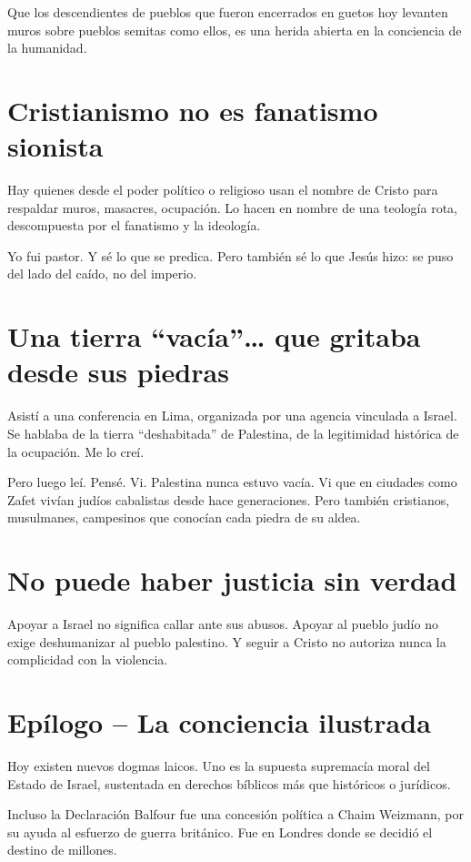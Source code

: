 \documentclass[12pt]{article}
\begin{document}
Que los descendientes de pueblos que fueron encerrados en guetos hoy levanten muros sobre pueblos semitas como ellos, es una herida abierta en la conciencia de la humanidad.

\section*{Cristianismo no es fanatismo sionista}

Hay quienes desde el poder político o religioso usan el nombre de Cristo para respaldar muros, masacres, ocupación. Lo hacen en nombre de una teología rota, descompuesta por el fanatismo y la ideología.

Yo fui pastor. Y sé lo que se predica. Pero también sé lo que Jesús hizo: se puso del lado del caído, no del imperio.

\section*{Una tierra “vacía”… que gritaba desde sus piedras}

Asistí a una conferencia en Lima, organizada por una agencia vinculada a Israel. Se hablaba de la tierra “deshabitada” de Palestina, de la legitimidad histórica de la ocupación. Me lo creí.

Pero luego leí. Pensé. Vi. Palestina nunca estuvo vacía. Vi que en ciudades como Zafet vivían judíos cabalistas desde hace generaciones. Pero también cristianos, musulmanes, campesinos que conocían cada piedra de su aldea.

\section*{No puede haber justicia sin verdad}

Apoyar a Israel no significa callar ante sus abusos.  
Apoyar al pueblo judío no exige deshumanizar al pueblo palestino.  
Y seguir a Cristo no autoriza nunca la complicidad con la violencia.

\section*{Epílogo – La conciencia ilustrada}

Hoy existen nuevos dogmas laicos. Uno es la supuesta supremacía moral del Estado de Israel, sustentada en derechos bíblicos más que históricos o jurídicos.

Incluso la Declaración Balfour fue una concesión política a Chaim Weizmann, por su ayuda al esfuerzo de guerra británico. Fue en Londres donde se decidió el destino de millones.
\end{document}
